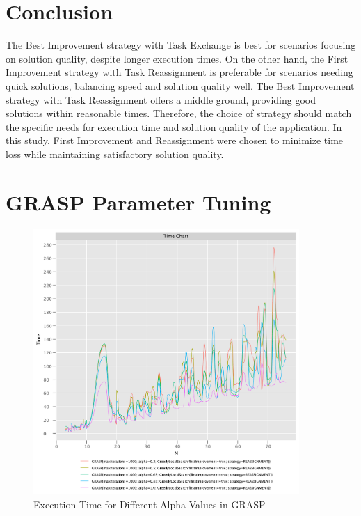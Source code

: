 \documentclass{article}
\begin{document}
\section*{Conclusion}
The Best Improvement strategy with Task Exchange is best for scenarios focusing on solution quality, despite longer execution times. On the other hand, the First Improvement strategy with Task Reassignment is preferable for scenarios needing quick solutions, balancing speed and solution quality well. The Best Improvement strategy with Task Reassignment offers a middle ground, providing good solutions within reasonable times. Therefore, the choice of strategy should match the specific needs for execution time and solution quality of the application. In this study, First Improvement and Reassignment were chosen to minimize time loss while maintaining satisfactory solution quality.


\newpage

\section{GRASP Parameter Tuning}

\begin{figure}[!h]
    \centering
    \includegraphics[width=0.9\textwidth]{./documentation/assets/new.GRASPParams.timeChart.pdf}
    \caption{Execution Time for Different Alpha Values in GRASP}
    \label{fig:grasp_time}
\end{figure}\FloatBarrier
\end{document}
